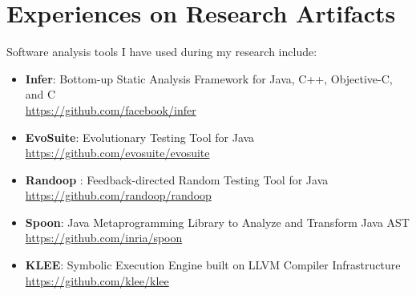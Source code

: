 \clearpage

\section{Experiences on Research Artifacts}
Software analysis tools I have used during my research include:
\vspace{1mm}
\begin{itemize}
\item \textbf{Infer}: Bottom-up Static Analysis Framework for Java, C++, Objective-C, and C \\
\url{https://github.com/facebook/infer}
\vspace{1mm}
\item \textbf{EvoSuite}: Evolutionary Testing Tool for Java \\
\url{https://github.com/evosuite/evosuite}
\vspace{1mm}
\item \textbf{Randoop} : Feedback-directed Random Testing Tool for Java \\
\url{https://github.com/randoop/randoop}
\vspace{1mm}
\item \textbf{Spoon}: Java Metaprogramming Library to Analyze and Transform Java AST \\
\url{https://github.com/inria/spoon}
\vspace{1mm}
\item \textbf{KLEE}: Symbolic Execution Engine built on LLVM Compiler Infrastructure \\
\url{https://github.com/klee/klee}
\end{itemize}

\vspace{9mm}
